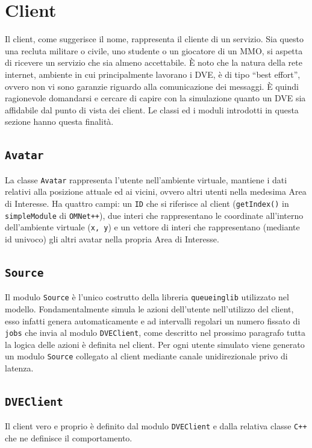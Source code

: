 \documentclass[a4paper, 11pt, oneside]{book}
\newcommand{\files}[1]{\texttt{#1}}
\theoremstyle{definition}
\theoremstyle{remark}
\begin{document}
\section{Client}
Il client, come suggerisce il nome, rappresenta il cliente di un servizio. Sia
questo una recluta militare o civile, uno studente o un giocatore di un MMO, si
aspetta di ricevere un servizio che sia almeno accettabile.
\`E noto che la natura della rete internet, ambiente in cui principalmente
lavorano i DVE, è di tipo ``best effort'', ovvero non vi sono garanzie riguardo
alla comunicazione dei messaggi. \`E quindi ragionevole domandarsi e cercare
di capire con la simulazione quanto un DVE sia affidabile dal punto di vista
dei client. Le classi ed i moduli introdotti in questa sezione hanno questa
finalità.

\subsection{\texttt{Avatar}}
La classe \files{Avatar} rappresenta l'utente nell'ambiente virtuale, mantiene
i dati relativi alla posizione attuale ed ai vicini, ovvero altri utenti nella
medesima Area di Interesse.
Ha quattro campi: un \files{ID} che si riferisce al client (\texttt{getIndex()}
in \texttt{simpleModule} di \texttt{OMNet++}), due interi che rappresentano le
coordinate
all'interno dell'ambiente virtuale (\texttt{x, y}) e un vettore di interi che
rappresentano (mediante id univoco) gli altri avatar nella propria Area di
Interesse.

\subsection{\texttt{Source}}
Il modulo \texttt{Source} è l'unico costrutto della libreria
\texttt{queueinglib} utilizzato nel modello. Fondamentalmente simula le azioni
dell'utente nell'utilizzo del client, esso infatti genera automaticamente e
ad intervalli regolari un numero fissato di \texttt{jobs} che invia al modulo
\texttt{DVEClient}, come descritto nel prossimo paragrafo tutta la logica delle
azioni è definita nel client. Per ogni utente simulato viene generato un
modulo \texttt{Source} collegato al client mediante canale unidirezionale
privo di latenza.

\subsection{\texttt{DVEClient}}
Il client vero e proprio è definito dal modulo \texttt{DVEClient} e dalla
relativa classe \texttt{C++} che ne definisce il comportamento.
\end{document}

